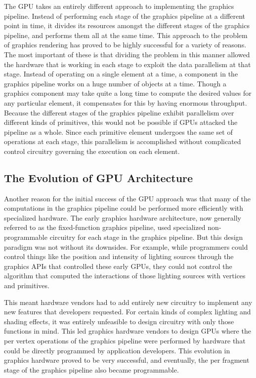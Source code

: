 \documentclass[12pt,twoside]{reedthesis}
\begin{document}
The GPU takes an entirely different approach to implementing the graphics pipeline. Instead of performing each stage of the graphics pipeline at a different point in time, it divides its resources amongst the different stages of the graphics pipeline, and performs them all at the same time. This approach to the problem of graphics rendering has proved to be highly successful for a variety of reasons. The most important of these is that dividing the problem in this manner allowed the hardware that is working in each stage to exploit the data parallelism at that stage. Instead of operating on a single element at a time, a component in the graphics pipeline works on a huge number of objects at a time. Though a graphics component may take quite a long time to compute the desired values for any particular element, it compensates for this by having enormous throughput. Because the different stages of the graphics pipeline exhibit parallelism over different kinds of primitives, this would not be possible if GPUs attacked the pipeline as a whole. Since each primitive element undergoes the same set of operations at each stage, this parallelism is accomplished without complicated control circuitry governing the execution on each element.

\subsection{The Evolution of GPU Architecture}

Another reason for the initial success of the GPU approach was that many of the computations in the graphics pipeline could be performed more efficiently with specialized hardware. The early graphics hardware architecture, now generally referred to as the fixed-function graphics pipeline, used specialized non-programmable circuitry for each stage in the graphics pipeline. But this design paradigm was not without its downsides. For example, while programmers could control things like the position and intensity of lighting sources through the graphics APIs that controlled these early GPUs, they could not control the algorithm that computed the interactions of those lighting sources with vertices and primitives.

This meant hardware vendors had to add entirely new circuitry to implement any new features that developers requested. For certain kinds of complex lighting and shading effects, it was entirely unfeasible to design circuitry with only those functions in mind. This led graphics hardware vendors to design GPUs where the per vertex operations of the graphics pipeline were performed by hardware that could be directly programmed by application developers. This evolution in graphics hardware proved to be very successful, and eventually, the per fragment stage of the graphics pipeline also became programmable.
\end{document}
